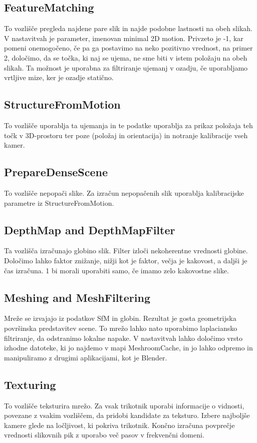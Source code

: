 \subsection{FeatureMatching}
    To vozlišče pregleda najdene pare slik in najde podobne lastnosti na obeh slikah. V nastavitvah je parameter, imenovan minimal 2D motion. Privzeto je -1, kar pomeni onemogočeno, če pa ga postavimo na neko pozitivno vrednost, na primer 2, določimo, da se točka, ki naj se ujema, ne sme biti v istem položaju na obeh slikah. Ta možnost je uporabna za filtriranje ujemanj v ozadju, če uporabljamo vrtljive mize, ker je ozadje statično.

\subsection{StructureFromMotion}
    To vozlišče uporablja ta ujemanja in te podatke uporablja za prikaz položaja teh točk v 3D-prostoru ter poze (položaj in orientacija) in notranje kalibracije vseh kamer.

\subsection{PrepareDenseScene}
    To vozlišče nepopači slike. Za izračun nepopačenih slik uporablja kalibracijske parametre iz StructureFromMotion.

\subsection{DepthMap and DepthMapFilter}
    Ta vozlišča izračunajo globino slik. Filter izloči nekoherentne vrednosti globine. Določimo lahko faktor znižanje, nižji kot je faktor, večja je kakovost, a daljši je čas izračuna. 1 bi morali uporabiti samo, če imamo zelo kakovostne slike.

\subsection{Meshing and MeshFiltering}
    Mreže se izvajajo iz podatkov SfM in globin. Rezultat je gosta geometrijska površinska predstavitev scene. To mrežo lahko nato uporabimo laplaciansko filtriranje, da odstranimo lokalne napake. V nastavitvah lahko določimo vrsto izhodne datoteke, ki jo najdemo v mapi MeshroomCache, in jo lahko odpremo in manipuliramo z drugimi aplikacijami, kot je Blender.

\subsection{Texturing}
    To vozlišče teksturira mrežo. Za vsak trikotnik uporabi informacije o vidnosti, povezane z vsakim vozliščem, da pridobi kandidate za teksturo. Izbere najboljše kamere glede na ločljivost, ki pokriva trikotnik. Končno izračuna povprečje vrednosti slikovnih pik z uporabo več pasov v frekvenčni domeni.

